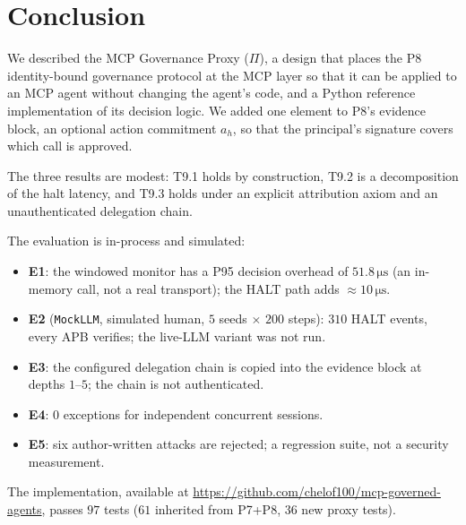 \documentclass[11pt]{article}
\newcommand{\ahash}{a_h}   %
\newcommand{\Proxy}{\Pi}
\begin{document}
\section{Conclusion}
\label{sec:conclusion}

We described the MCP Governance Proxy ($\Proxy$), a design that places
the P8 identity-bound governance protocol at the MCP layer so that it
can be applied to an MCP agent without changing the agent's code, and a
Python reference implementation of its decision logic. We added one
element to P8's evidence block, an optional action commitment $\ahash$,
so that the principal's signature covers which call is approved.

The three results are modest: T9.1 holds by construction, T9.2 is a
decomposition of the halt latency, and T9.3 holds under an explicit
attribution axiom and an unauthenticated delegation chain.

The evaluation is in-process and simulated:
\begin{itemize}[leftmargin=2em, topsep=2pt, itemsep=1pt]
  \item \textbf{E1}: the windowed monitor has a P95 decision overhead of
        $51.8\,\si{\micro\second}$ (an in-memory call, not a real
        transport); the HALT path adds $\approx 10\,\si{\micro\second}$.
  \item \textbf{E2} (\texttt{MockLLM}, simulated human, $5$ seeds
        $\times$ $200$ steps): $310$ HALT events, every APB verifies;
        the live-LLM variant was not run.
  \item \textbf{E3}: the configured delegation chain is copied into the
        evidence block at depths $1$--$5$; the chain is not authenticated.
  \item \textbf{E4}: $0$ exceptions for independent concurrent sessions.
  \item \textbf{E5}: six author-written attacks are rejected; a
        regression suite, not a security measurement.
\end{itemize}

The implementation, available at
\url{https://github.com/chelof100/mcp-governed-agents}, passes $97$
tests ($61$ inherited from P7+P8, $36$ new proxy tests).
\end{document}
